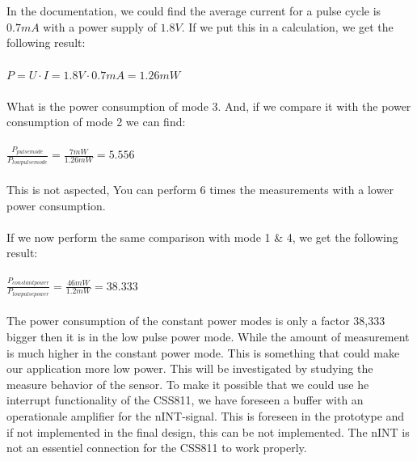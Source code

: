 \documentclass[11pt,a4paper]{article}
\begin{document}
\\ \\
In the documentation, we could find the average current for a pulse cycle is $0.7 mA$ with a power supply of $1.8 V$. If we put this in a calculation, we get the following result:
\\ \\
$P= U \cdot I=1.8 V \cdot 0.7 mA = 1.26 mW$
\\ \\
What is the power consumption of mode 3. And, if we compare it with the power consumption of mode 2 we can find:
\\ \\
$\frac{P_{pulse mode}}{P_{low pulse mode}}= \frac{7 mW}{1.26 mW}= 5.556$
\\ \\
This is not aspected, You can perform 6 times the measurements with a lower power consumption.
\\ \\
If we now perform the same comparison with mode 1 \& 4, we get the following result:
\\ \\
$\frac{P_{constant power}} {P_{low pulse power}}= \frac{46mW}{1.2 mW}= 38.333$
\\ \\
The power consumption of the constant power modes  is only a factor 38,333 bigger then it is in the low pulse power mode. While the amount of measurement is much higher in the constant power mode. This is something that could make our application more low power. This will be investigated by studying the measure behavior of the sensor. To make it possible that we could use he interrupt functionality of the CSS811, we have foreseen a buffer with an operationale amplifier for the nINT-signal.  This is foreseen in the prototype and if not implemented in the final design, this can be not implemented. The nINT is not an essentiel connection for the CSS811 to work properly.
\end{document}
